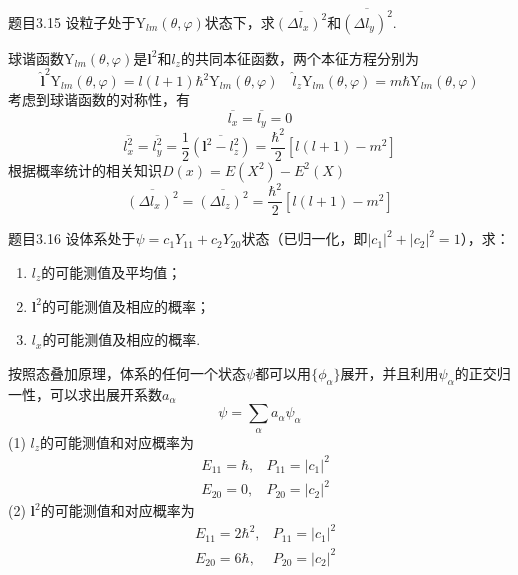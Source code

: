 \begin{question}{题目3.15}
    设粒子处于$\mathrm{Y}_{lm}(\theta,\varphi)$状态下，求$\overline{(\Delta l_x)^2}$和$\overline{(\Delta l_y)^2}$.
\end{question}
\begin{solution}
    球谐函数$\mathrm{Y}_{lm}(\theta, \varphi)$是$\boldsymbol{l}^2$和$l_z$的共同本征函数，两个本征方程分别为
    $$
        \hat{\boldsymbol{l}}^2\mathrm{Y}_{lm}(\theta, \varphi)=l(l+1)\hbar^2\mathrm{Y}_{lm}(\theta,\varphi)
        \quad
        \hat{l}_z\mathrm{Y}_{lm}(\theta, \varphi)=m\hbar\mathrm{Y}_{lm}(\theta,\varphi)
    $$
    考虑到球谐函数的对称性，有
    $$
        \overline{l_x} = \overline{l_y} = 0
    $$
    $$
        \overline{l_x^2} = \overline{l_y^2} = \frac{1}{2}\overline{\left(\boldsymbol{l}^2-l_z^2\right)} = \frac{\hbar^2}{2}\left[l(l+1)-m^2\right]
    $$
    根据概率统计的相关知识$D(x)=E(X^2)-E^2(X)$
    $$
        \overline{(\Delta l_x)^2} = \overline{(\Delta l_z)^2} = \frac{\hbar^2}{2}\left[l(l+1)-m^2\right]
    $$
\end{solution}




\begin{question}{题目3.16}
    设体系处于$\psi=c_1Y_{11}+c_2Y_{20}$状态（已归一化，即$|c_1|^2+|c_2|^2=1$），求：
    \begin{enumerate}
        \item $l_z$的可能测值及平均值；
        \item $\boldsymbol{l}^2$的可能测值及相应的概率；
        \item $l_x$的可能测值及相应的概率.
    \end{enumerate}
\end{question}
\begin{solution}
    按照态叠加原理，体系的任何一个状态$\psi$都可以用$\{\phi_{\alpha}\}$展开，并且利用$\psi_{\alpha}$的正交归一性，可以求出展开系数$a_{\alpha}$
    $$
        \psi = \sum_{\alpha} a_{\alpha}\psi_{\alpha}
    $$
    (1) $l_z$的可能测值和对应概率为
    $$
        \begin{aligned}
             & E_{11} = \hbar, & P_{11} = |c_1|^2 \\
             & E_{20} = 0,     & P_{20} = |c_2|^2
        \end{aligned}
    $$
    (2) $\boldsymbol{l}^2$的可能测值和对应概率为
    $$
        \begin{aligned}
             & E_{11} = 2\hbar^2, & P_{11} = |c_1|^2 \\
             & E_{20} = 6\hbar,   & P_{20} = |c_2|^2
        \end{aligned}
    $$
\end{solution}





